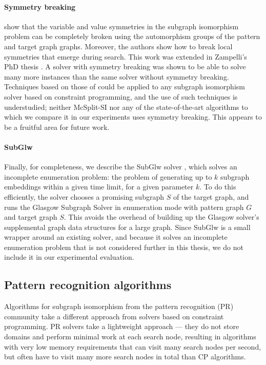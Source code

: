 \paragraph*{Symmetry breaking}
\citet{zampelli2007symmetry} show that the variable and value symmetries
in the subgraph isomorphism problem can be completely broken using
the automorphism groups of the pattern and target graph graphs.
Moreover, the authors show how to break local symmetries that emerge
during search.
This work was extended in Zampelli's PhD thesis \citep{DBLP:phd/basesearch/Zampelli08}.
A solver with symmetry breaking was shown to be able to solve many more instances
than the same solver without symmetry breaking. 
Techniques based on those of \citeauthor{zampelli2007symmetry} 
could be applied to any subgraph isomorphism solver based on constraint programming,
and the use of such techniques is understudied; neither McSplit-SI nor any of
the state-of-the-art algorithms to which we compare it in our experiments
uses symmetry breaking.  This appears to be a fruitful area for future
work.

\paragraph*{SubGlw}
Finally, for completeness, we describe the SubGlw solver \citep{DBLP:journals/access/AnsariJA21},
which solves an incomplete enumeration problem: the problem of
generating up to $k$ subgraph embeddings within a given time limit, for a given
parameter $k$. To do this efficiently, the solver chooses a promising
subgraph $S$ of the target graph, and runs the Glasgow Subgraph Solver in enumeration
mode with pattern graph $G$ and target graph $S$. This avoids the overhead of
building up the Glasgow solver's supplemental graph data structures for a large
graph.  Since SubGlw is a small wrapper around an existing solver, and because
it solves an incomplete enumeration problem that is not considered further
in this thesis, we do not include it in our experimental evaluation.

\subsection{Pattern recognition algorithms}

Algorithms for subgraph isomorphism from the pattern recognition (PR) community
take a different approach from solvers based on constraint programming.  PR
solvers take a lightweight approach --- they do not store domains and perform
minimal work at each search node, resulting in algorithms with very low memory
requirements that can visit many search nodes per second, but often have to
visit many more search nodes in total than CP algorithms.

